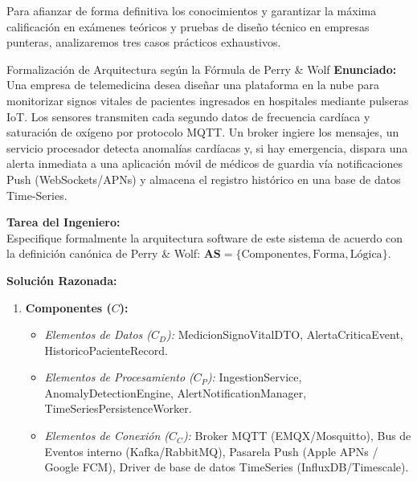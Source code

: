 Para afianzar de forma definitiva los conocimientos y garantizar la máxima calificación en exámenes teóricos y pruebas de diseño técnico en empresas punteras, analizaremos tres casos prácticos exhaustivos.

\begin{ejercicioresuelto}{Formalización de Arquitectura según la Fórmula de Perry \& Wolf}
\textbf{Enunciado:}\\
Una empresa de telemedicina desea diseñar una plataforma en la nube para monitorizar signos vitales de pacientes ingresados en hospitales mediante pulseras IoT. Los sensores transmiten cada segundo datos de frecuencia cardíaca y saturación de oxígeno por protocolo MQTT. Un broker ingiere los mensajes, un servicio procesador detecta anomalías cardíacas y, si hay emergencia, dispara una alerta inmediata a una aplicación móvil de médicos de guardia vía notificaciones Push (WebSockets/APNs) y almacena el registro histórico en una base de datos Time-Series.

\textbf{Tarea del Ingeniero:}\\
Especifique formalmente la arquitectura software de este sistema de acuerdo con la definición canónica de Perry \& Wolf: $\mathbf{AS} = \{\text{Componentes}, \text{Forma}, \text{Lógica}\}$.

\vspace{0.5em}
\textbf{Solución Razonada:}

\begin{enumerate}[leftmargin=1.5em]
  \item \textbf{Componentes ($C$):}
    \begin{itemize}
      \item \emph{Elementos de Datos ($C_D$):} MedicionSignoVitalDTO, AlertaCriticaEvent, HistoricoPacienteRecord.
      \item \emph{Elementos de Procesamiento ($C_P$):} IngestionService, AnomalyDetectionEngine, AlertNotificationManager, TimeSeriesPersistenceWorker.
      \item \emph{Elementos de Conexión ($C_C$):} Broker MQTT (EMQX/Mosquitto), Bus de Eventos interno (Kafka/RabbitMQ), Pasarela Push (Apple APNs / Google FCM), Driver de base de datos TimeSeries (InfluxDB/Timescale).
    \end{itemize}


\end{enumerate}
\end{ejercicioresuelto}
